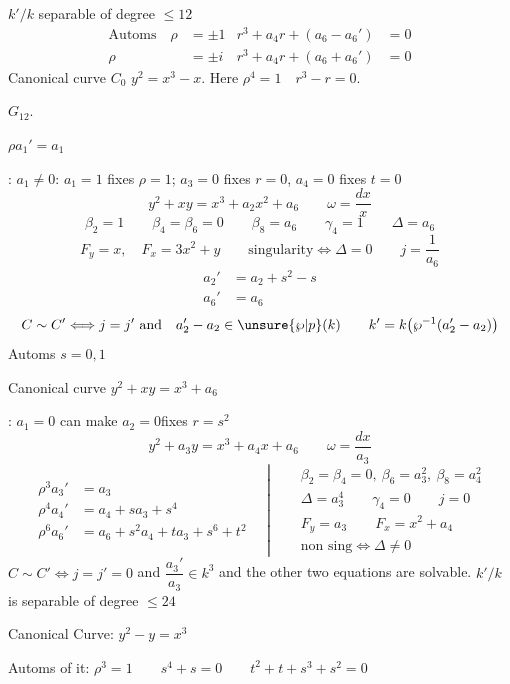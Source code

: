 $k'/k$ separable of degree $\le12$
\[
\begin{aligned}
\text{Automs}\quad \rho&=\pm1 & r^3+a_4r+(a_6-a_6')&=0\\
\rho&=\pm i & r^3+a_4r+(a_6+a_6')&=0
\end{aligned}
\]
Canonical curve $C_0$ \unsure{:} \quad $y^2=x^3-x$. Here $\rho^4=1\quad r^3-r=0$.

$G_{12}$.

\qquad $\rho a_1'=a_1$

: \quad $a_1\ne0$: \quad $a_1=1$ fixes $\rho=1$; $a_3=0$ fixes $r=0$, $a_4=0$ fixes $t=0$
\[
\boxed{y^2+xy=x^3+a_2x^2+a_6}\qquad \omega=\frac{dx}{x}
\]
\[
\beta_2=1\qquad \beta_4=\beta_6=0\qquad\beta_8=a_6\qquad\gamma_4=1\qquad\Delta=a_6
\]
\[
F_y=x,\quad F_x=3x^2+y\qquad \text{singularity}\Longleftrightarrow\Delta=0
\qquad j=\frac1{a_6}
\]
\[
\begin{aligned}
a_2'&=a_2+s^2-s\\
a_6'&=a_6
\end{aligned}
\]
\[
C\sim C'\Longleftrightarrow j=j'\ \text{and}\quad
a_2'-a_2\in\unsure{\wp|p}(k)\qquad k'=k\bigl(\wp^{-1}(a_2'-a_2)\bigr)
\]
Automs \quad $s=0,1$

Canonical curve \quad $y^2+xy=x^3+a_6$

: \quad $a_1=0$ \qquad can make $a_2=0$\qquad fixes $r=s^2$
\[
\boxed{y^2+a_3y=x^3+a_4x+a_6}\qquad \omega=\frac{dx}{a_3}
\]
\[
\begin{aligned}
\rho^3a_3'&=a_3\\
\rho^4a_4'&=a_4+sa_3+s^4\\
\rho^6a_6'&=a_6+s^2a_4+ta_3+s^6+t^2
\end{aligned}
\quad\left|\quad
\begin{aligned}
&\beta_2=\beta_4=0,\ \beta_6=a_3^2,\ \beta_8=a_4^2\\
&\Delta=a_3^4\qquad\gamma_4=0\qquad j=0\\
&F_y=a_3\qquad F_x=x^2+a_4\\
&\text{non sing}\Longleftrightarrow\Delta\ne0
\end{aligned}\right.
\]
$C\sim C'\Longleftrightarrow j=j'=0$ and $\dfrac{a_3'}{a_3}\in k^3$ and the other two equations are solvable. \quad $k'/k$ is separable of degree $\le24$

Canonical Curve: \quad $y^2-y=x^3$

Automs of it: \qquad $\rho^3=1\qquad s^4+s=0\qquad t^2+t+s^3+s^2=0$

